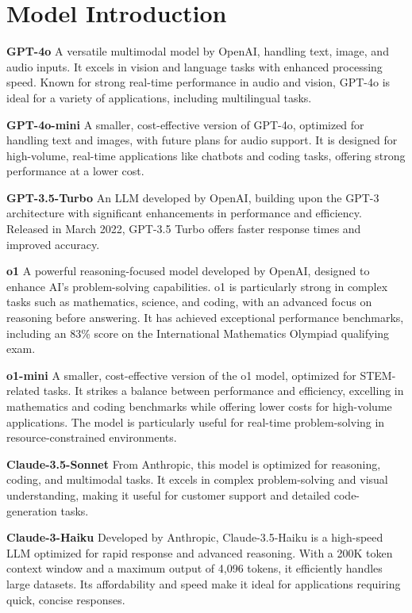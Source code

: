 \clearpage
\appendix

\section{Model Introduction}

\textbf{GPT-4o} \cite{openai_gpt4o_2024} A versatile multimodal model by OpenAI, handling text, image, and audio inputs. It excels in vision and language tasks with enhanced processing speed. Known for strong real-time performance in audio and vision, GPT-4o is ideal for a variety of applications, including multilingual tasks.

\textbf{GPT-4o-mini} \cite{openai2024gpt4omini} A smaller, cost-effective version of GPT-4o, optimized for handling text and images, with future plans for audio support. It is designed for high-volume, real-time applications like chatbots and coding tasks, offering strong performance at a lower cost.

\textbf{GPT-3.5-Turbo} \cite{openai2023gpt35turbo} An LLM developed by OpenAI, building upon the GPT-3 architecture with significant enhancements in performance and efficiency. Released in March 2022, GPT-3.5 Turbo offers faster response times and improved accuracy.

\textbf{o1} \cite{openai2024o1} A powerful reasoning-focused model developed by OpenAI, designed to enhance AI's problem-solving capabilities. o1 is particularly strong in complex tasks such as mathematics, science, and coding, with an advanced focus on reasoning before answering. It has achieved exceptional performance benchmarks, including an 83\% score on the International Mathematics Olympiad qualifying exam.

\textbf{o1-mini} \cite{openai2024o1mini} A smaller, cost-effective version of the o1 model, optimized for STEM-related tasks. It strikes a balance between performance and efficiency, excelling in mathematics and coding benchmarks while offering lower costs for high-volume applications. The model is particularly useful for real-time problem-solving in resource-constrained environments.



\textbf{Claude-3.5-Sonnet} \cite{anthropic2024claude35} From Anthropic, this model is optimized for reasoning, coding, and multimodal tasks. It excels in complex problem-solving and visual understanding, making it useful for customer support and detailed code-generation tasks.

\textbf{Claude-3-Haiku} \cite{anthropic2024claude3haiku} Developed by Anthropic, Claude-3.5-Haiku is a high-speed LLM optimized for rapid response and advanced reasoning. With a 200K token context window and a maximum output of 4,096 tokens, it efficiently handles large datasets. Its affordability and speed make it ideal for applications requiring quick, concise responses.

